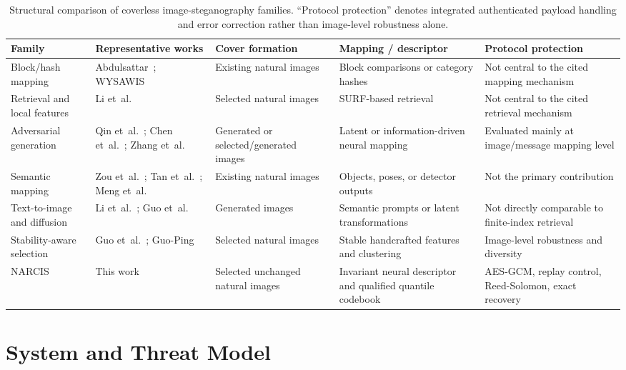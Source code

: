 \documentclass[10pt,journal]{IEEEtran}
\newcommand{\method}{NARCIS\xspace}
\begin{document}
\begin{table}[t]
\centering
\caption{Structural comparison of coverless image-steganography
  families. ``Protocol protection'' denotes integrated authenticated
  payload handling and error correction rather than image-level
  robustness alone.}
\label{tab:taxonomy}
\small
\begin{tabularx}{\textwidth}{p{2.5cm}p{2.4cm}p{3.0cm}p{3.0cm}Y}
\toprule
Family & Representative works & Cover formation &
Mapping / descriptor & Protocol protection\\
\midrule
Block/hash mapping &
Abdulsattar~\cite{abdulsattar2021}; WYSAWIS~\cite{wysawis2025} &
Existing natural images &
Block comparisons or category hashes &
Not central to the cited mapping mechanism\\
Retrieval and local features &
Li et~al.~\cite{li2024surf} &
Selected natural images &
SURF-based retrieval &
Not central to the cited retrieval mechanism\\
Adversarial generation &
Qin et~al.~\cite{qin2020gan}; Chen et~al.~\cite{chen2022stargan};
Zhang et~al.~\cite{zhang2023idgan} &
Generated or selected/generated images &
Latent or information-driven neural mapping &
Evaluated mainly at image/message mapping level\\
Semantic mapping &
Zou et~al.~\cite{zou2023neglected}; Tan et~al.~\cite{tan2024pose};
Meng et~al.~\cite{meng2024object} &
Existing natural images &
Objects, poses, or detector outputs &
Not the primary contribution\\
Text-to-image and diffusion &
Li et~al.~\cite{li2025semantic}; Guo et~al.~\cite{guo2026diffusion} &
Generated images &
Semantic prompts or latent transformations &
Not directly comparable to finite-index retrieval\\
Stability-aware selection &
Guo et~al.~\cite{guo2025diverse}; Guo-Ping~\cite{guo2026capacity} &
Selected natural images &
Stable handcrafted features and clustering &
Image-level robustness and diversity\\
\method & This work &
Selected unchanged natural images &
Invariant neural descriptor and qualified quantile codebook &
AES-GCM, replay control, Reed-Solomon, exact recovery\\
\bottomrule
\end{tabularx}
\end{table}

\section{System and Threat Model}
\label{sec:model}
\end{document}
